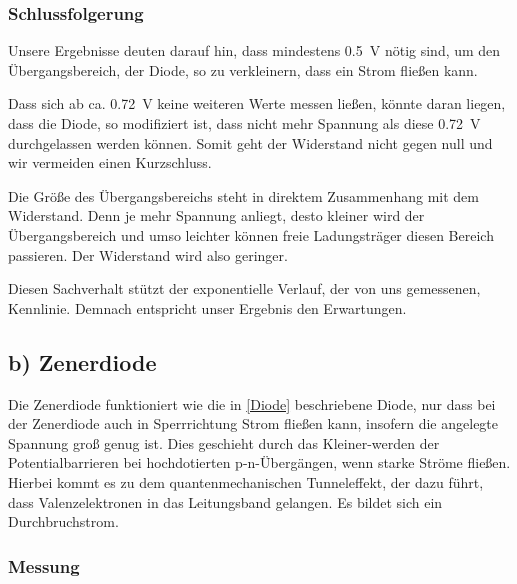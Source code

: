 \documentclass[11pt,a4paper,titlepage, ngerman]{article}
\begin{document}
			\subsubsection*{Schlussfolgerung}
			
				Unsere Ergebnisse deuten darauf hin, dass mindestens \SI{0.5}{\V} nötig sind, um den Übergangsbereich, der Diode, so zu verkleinern, dass ein Strom fließen kann. 
				
				Dass sich ab ca. \SI{0.72}{\V} keine weiteren Werte messen ließen, könnte daran liegen, dass die Diode, so modifiziert ist, dass nicht mehr Spannung als diese \SI{0.72}{\V} durchgelassen werden können. Somit geht der Widerstand nicht gegen null und wir vermeiden einen Kurzschluss.
				
				Die Größe des Übergangsbereichs steht in direktem Zusammenhang mit dem Widerstand.  Denn je mehr Spannung anliegt, desto kleiner wird der Übergangsbereich und umso leichter können freie Ladungsträger diesen Bereich passieren. Der Widerstand wird also geringer.
				
				Diesen Sachverhalt stützt der exponentielle Verlauf, der von uns gemessenen, Kennlinie. Demnach entspricht unser Ergebnis den Erwartungen.
				
		\subsection{b) Zenerdiode} 
			
			Die Zenerdiode funktioniert wie die in \ref{Diode} beschriebene Diode, nur dass bei der Zenerdiode auch in Sperrrichtung Strom fließen kann, insofern die angelegte Spannung groß genug ist. Dies geschieht durch das Kleiner-werden der Potentialbarrieren bei hochdotierten p-n-Übergängen, wenn starke Ströme fließen. Hierbei kommt es zu dem quantenmechanischen Tunneleffekt, der dazu führt, dass Valenzelektronen in das Leitungsband gelangen. Es bildet sich ein Durchbruchstrom.
			
			\subsubsection*{Messung}
			
\end{document}
